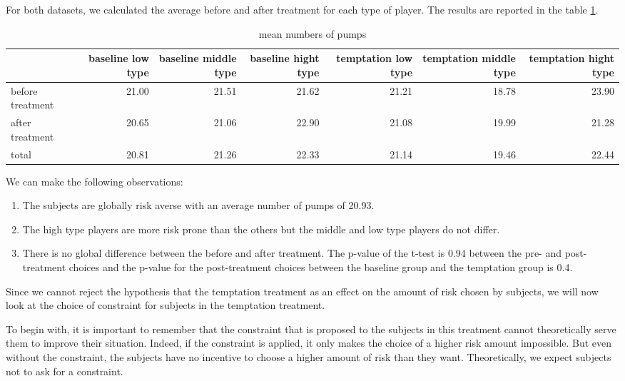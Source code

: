 \documentclass[
]{book}
\providecommand{\tightlist}{%
  \setlength{\itemsep}{0pt}\setlength{\parskip}{0pt}}
\begin{document}
For both datasets, we calculated the average before and after treatment for
each type of player.
The results are reported in the table \ref{tab:desc-stat2}.

\begin{table}

\caption{\label{tab:desc-stat2}mean numbers of pumps}
\centering
\begin{tabular}[t]{l|r|r|r|r|r|r}
\hline
 & baseline low type & baseline middle type & baseline hight type & temptation low type & temptation middle type & temptation hight type\\
\hline
before treatment & 21.00 & 21.51 & 21.62 & 21.21 & 18.78 & 23.90\\
\hline
after treatment & 20.65 & 21.06 & 22.90 & 21.08 & 19.99 & 21.28\\
\hline
total & 20.81 & 21.26 & 22.33 & 21.14 & 19.46 & 22.44\\
\hline
\end{tabular}
\end{table}

We can make the following observations:

\begin{enumerate}
\def\labelenumi{\arabic{enumi}.}
\tightlist
\item
  The subjects are globally risk averse with an average number of pumps of
  20.93.
\item
  The high type players are more risk prone than the others but the middle
  and low type players do not differ.
\item
  There is no global difference between the before and after treatment.
  The p-value of the t-test is 0.94 between the pre- and post-treatment
  choices and the p-value for the post-treatment choices between the baseline
  group and the temptation group is 0.4.
\end{enumerate}

Since we cannot reject the hypothesis that the temptation treatment as an effect
on the amount of risk chosen by subjects, we will now look at the choice of
constraint for subjects in the temptation treatment.

To begin with, it is important to remember that the constraint that is proposed
to the subjects in this treatment cannot theoretically serve them to improve
their situation.
Indeed, if the constraint is applied, it only makes the choice of a higher risk
amount impossible.
But even without the constraint, the subjects have no incentive to choose a
higher amount of risk than they want.
Theoretically, we expect subjects not to ask for a constraint.
\end{document}

